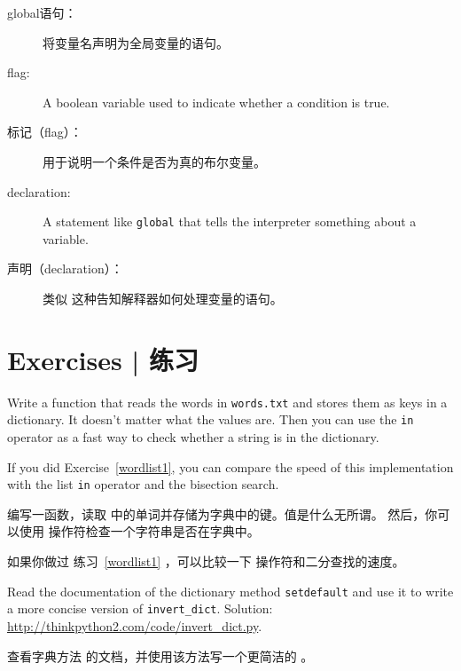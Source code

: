 \begin{description}
\item[global语句：]  将变量名声明为全局变量的语句。

  

\item[flag:] A boolean variable used to indicate whether a condition
is true.


\item[标记（flag）：] 用于说明一个条件是否为真的布尔变量。


\item[declaration:] A statement like {\tt global} that tells the
interpreter something about a variable.


\item[声明（declaration）：] 类似  这种告知解释器如何处理变量的语句。


\end{description}



\section{Exercises  |  练习}

\begin{exercise}
\label{wordlist2}

  

Write a function that reads the words in {\tt words.txt} and
stores them as keys in a dictionary.  It doesn't matter what the
values are.  Then you can use the {\tt in} operator
as a fast way to check whether a string is in
the dictionary.

If you did Exercise~\ref{wordlist1}, you can compare the speed
of this implementation with the list {\tt in} operator and the
bisection search.

编写一函数，读取  中的单词并存储为字典中的键。值是什么无所谓。
然后，你可以使用  操作符检查一个字符串是否在字典中。

如果你做过 练习~\ref{wordlist1} ，可以比较一下  操作符和二分查找的速度。

\end{exercise}


\begin{exercise}
\label{setdefault}

Read the documentation of the dictionary method {\tt setdefault}
and use it to write a more concise version of \verb"invert_dict".
Solution: \url{http://thinkpython2.com/code/invert_dict.py}.

查看字典方法  的文档，并使用该方法写一个更简洁的 。

  

\end{exercise}


